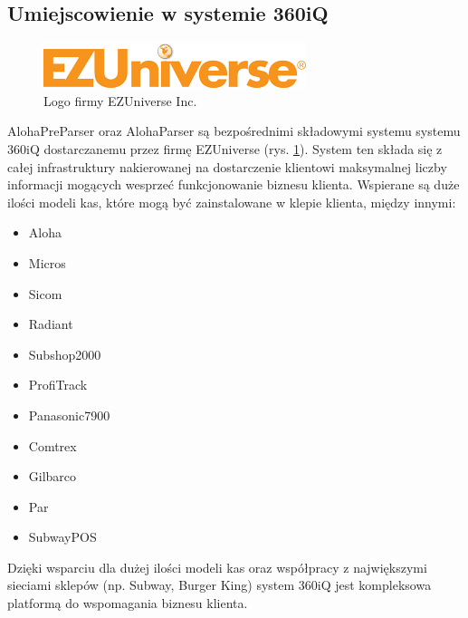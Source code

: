 \documentclass[a4paper]{book}
\begin{document}
\subsection{Umiejscowienie w systemie 360iQ}
\begin{figure}[h]
	\centering
	\includegraphics[width=\textwidth]{./img/EZUniverse.png}
	\caption{Logo firmy EZUniverse Inc.}
	\label{fig:EZUniverse}
\end{figure}
AlohaPreParser oraz AlohaParser są bezpośrednimi składowymi systemu systemu 360iQ dostarczanemu przez firmę EZUniverse (rys. \ref{fig:EZUniverse}). System ten składa się z całej infrastruktury nakierowanej na dostarczenie klientowi maksymalnej liczby informacji mogących wesprzeć funkcjonowanie biznesu klienta. Wspierane są duże ilości modeli kas, które mogą być zainstalowane w klepie klienta, między innymi:
\begin{itemize}
	\item Aloha
	\item Micros
	\item Sicom
	\item Radiant
	\item Subshop2000
	\item ProfiTrack
	\item Panasonic7900
	\item Comtrex
	\item Gilbarco
	\item Par
	\item SubwayPOS
\end{itemize}

Dzięki wsparciu dla dużej ilości modeli kas oraz współpracy z największymi sieciami sklepów (np. Subway, Burger King) system 360iQ jest kompleksowa platformą do wspomagania biznesu klienta.
\end{document}
